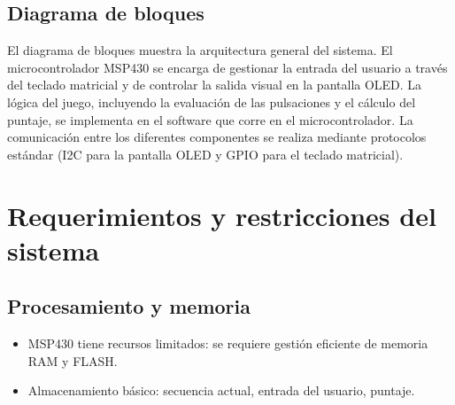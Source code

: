 \documentclass[a4paper,12pt]{article}
\begin{document}
\begin{linenumbers}
      \subsection{Diagrama de bloques}
      \label{sec:Diagrama de bloques}
      

      El diagrama de bloques muestra la arquitectura general del sistema. 
      El microcontrolador MSP430 se encarga de gestionar la entrada del usuario a través del teclado matricial y de controlar la salida visual en la pantalla OLED. La lógica del juego, incluyendo la evaluación de las pulsaciones y el cálculo del puntaje, se implementa en el software que corre en el microcontrolador. La comunicación entre los diferentes componentes se realiza mediante protocolos estándar (I2C para la pantalla OLED y GPIO para el teclado matricial).


  \section{Requerimientos y restricciones del sistema}
  \label{sec:Requ_Rest}
      \subsection{Procesamiento y memoria}
      \label{sec:Procesamiento y memoria}
      \begin{itemize}
        \item MSP430 tiene recursos limitados: se requiere gestión eficiente de memoria RAM y FLASH.
        \item Almacenamiento básico: secuencia actual, entrada del usuario, puntaje.
      \end{itemize} 



\end{linenumbers}
\end{document}
